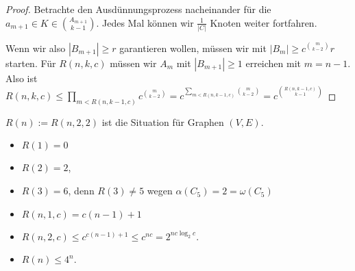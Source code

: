 \begin{st}[Ramsey, 1930]
\begin{proof}
        Betrachte den Ausdünnungsprozess nacheinander für die $a_{m+1} \in K \in \binom{A_{m+1}}{k-1}$.
        Jedes Mal können wir $\frac{1}{|C|}$ Knoten weiter fortfahren.

        Wenn wir also $|B_{m+1}| \ge r$ garantieren wollen, müssen wir mit $|B_m| \ge c^{\binom{m}{k-2}} r$ starten.
        Für $R(n,k,c)$ müssen wir $A_m$ mit $|B_{m+1}| \ge 1$ erreichen mit $m = n - 1$.
        Also ist
        \begin{math}
            R(n,k,c) \le \prod_{m < R(n,k-1,c)} c^{\binom{m}{k-2}}
            = c^{\sum_{m < R(n,k-1,c)} \binom{m}{k-2}}
            = c^{\binom{R(n,k-1,c)}{k-1}}
        \end{math}
    \end{proof}
\end{st}

\begin{ex}
    $R(n) := R(n, 2, 2)$ ist die Situation für Graphen $(V, E)$.
    \begin{itemize}
        \item
            $R(1) = 0$
        \item
            $R(2) = 2$,
        \item
            $R(3) = 6$,
            denn $R(3) \neq 5$ wegen
            $\alpha(C_5) = 2 = \omega(C_5)$
        \item
            $R(n,1,c) = c(n-1) + 1$
        \item
            $R(n,2,c) \le c^{c(n-1) + 1} \le c^{nc} = 2^{nc \log_2 c}$.
        \item
            $R(n) \le 4^n$.
    \end{itemize}
\end{ex}

